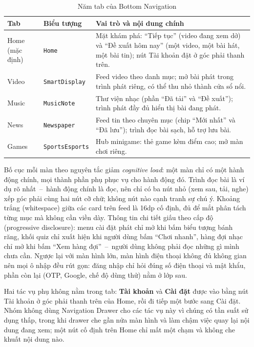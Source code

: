 \begin{table}[H]
\centering
\caption{Năm tab của Bottom Navigation}
\label{tab:bottom-nav}
\begin{tabularx}{\textwidth}{>{\raggedright\arraybackslash}p{1.8cm} >{\raggedright\arraybackslash}p{3.4cm} >{\raggedright\arraybackslash}X}
\toprule
\textbf{Tab} & \textbf{Biểu tượng} & \textbf{Vai trò và nội dung chính} \\
\midrule
Home (mặc định) & \texttt{Home} & Mặt khám phá: ``Tiếp tục'' (video đang xem dở) và ``Đề xuất hôm nay'' (một video, một bài hát, một bài tin); nút Tài khoản đặt ở góc phải thanh trên. \\
Video & \texttt{SmartDisplay} & Feed video theo danh mục; mở bài phát trong trình phát riêng, có thể thu nhỏ thành cửa sổ nổi. \\
Music & \texttt{MusicNote} & Thư viện nhạc (phần ``Đã tải'' và ``Đề xuất''); trình phát đầy đủ hiển thị bài đang phát. \\
News & \texttt{Newspaper} & Feed tin theo chuyên mục (chip ``Mới nhất'' và ``Đã lưu''); trình đọc bài sạch, hỗ trợ lưu bài. \\
Games & \texttt{SportsEsports} & Hub minigame: thẻ game kèm điểm cao; mở màn chơi riêng. \\
\bottomrule
\end{tabularx}
\end{table}

Bố cục mỗi màn theo nguyên tắc giảm \textit{cognitive load}: một màn chỉ có một hành động chính, mọi thành phần phụ phục vụ cho hành động đó. Trình đọc bài là ví dụ rõ nhất~--~hành động chính là đọc, nên chỉ có ba nút nhỏ (xem sau, tải, nghe) xếp góc phải cùng hai nút cỡ chữ; không nút nào cạnh tranh sự chú ý. Khoảng trắng (whitespace) giữa các card trên feed là 16dp cố định, đủ để mắt phân tách từng mục mà không cần viền dày. Thông tin chi tiết giấu theo cấp độ (progressive disclosure): menu cài đặt phát chỉ mở khi bấm biểu tượng bánh răng, khối quiz chỉ xuất hiện khi người dùng bấm ``Chơi nhanh'', hàng đợi nhạc chỉ mở khi bấm ``Xem hàng đợi''~--~người dùng không phải đọc những gì mình chưa cần. Ngược lại với màn hình lớn, màn hình điện thoại không đủ không gian nên mọi ô nhập đều rút gọn: đăng nhập chỉ hỏi đúng số điện thoại và mật khẩu, phần còn lại (OTP, Google, chế độ dùng thử) nằm ở lớp sau.

Hai tác vụ phụ không nằm trong tab: \textbf{Tài khoản} và \textbf{Cài đặt} được vào bằng nút Tài khoản ở góc phải thanh trên của Home, rồi đi tiếp một bước sang Cài đặt. Nhóm không dùng Navigation Drawer cho các tác vụ này vì chúng có tần suất sử dụng thấp, trong khi drawer che gần nửa màn hình và làm chậm việc quay lại nội dung đang xem; một nút cố định trên Home chỉ mất một chạm và không che khuất nội dung nào.

